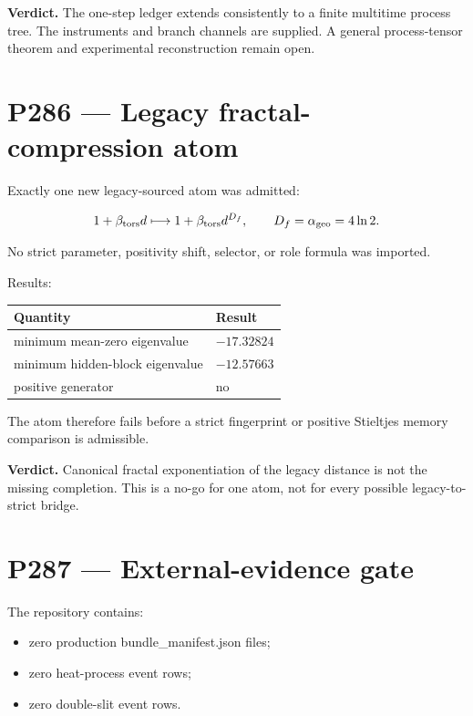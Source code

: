 \documentclass[11pt,a4paper,openany]{report}
\begin{document}
\textbf{Verdict.} The one-step ledger extends consistently to a finite multitime process tree. The instruments and branch channels are supplied. A general process-tensor theorem and experimental reconstruction remain open.

\chapter{P286 --- Legacy fractal-compression atom}

Exactly one new legacy-sourced atom was admitted:

\[
1+\beta_{\rm tors}d
\longmapsto
1+\beta_{\rm tors}d^{D_f},
\qquad
D_f=\alpha_{\rm geo}=4\ln2.
\]

No strict parameter, positivity shift, selector, or role formula was imported.

Results:

\begin{center}
\begingroup\small
\setlength{\tabcolsep}{2.5pt}
\renewcommand{\arraystretch}{1.16}
\begin{longtable}{@{}p{}p{}@{}}
\toprule
\textbf{Quantity} & \textbf{Result} \\
\midrule
\endhead
minimum mean-zero eigenvalue & \(-17.32824\) \\
minimum hidden-block eigenvalue & \(-12.57663\) \\
positive generator & no \\
\bottomrule
\end{longtable}
\endgroup
\end{center}

The atom therefore fails before a strict fingerprint or positive Stieltjes memory comparison is admissible.

\textbf{Verdict.} Canonical fractal exponentiation of the legacy distance is not the missing completion. This is a no-go for one atom, not for every possible legacy-to-strict bridge.

\chapter{P287 --- External-evidence gate}

The repository contains:

\begin{itemize}
\item 
zero production bundle\_manifest.json files;

\item 
zero heat-process event rows;

\item 
zero double-slit event rows.

\end{itemize}
\end{document}
